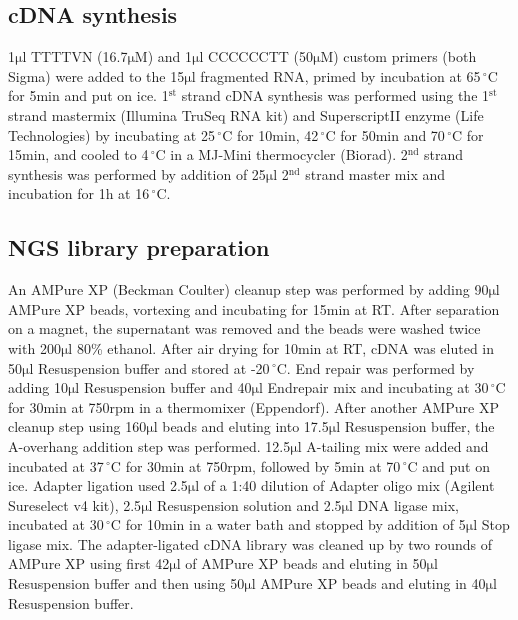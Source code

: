 \documentclass[10pt]{article}
\newcommand{\mul}{\ensuremath{\mathrm{\mu l}}}
\newcommand{\C}{\,$^{\circ}\mathrm{C}$}
\begin{document}
\subsection*{cDNA synthesis}

1{\mul} TTTTVN (16.7$\mathrm{\mu M}$) and 1{\mul} CCCCCCTT (50$\mathrm{\mu M}$) custom primers (both Sigma) were added to the 15{\mul} fragmented RNA, primed by incubation at 65{\C} for 5min and put on ice. 1$^\mathrm{st}$ strand cDNA synthesis was performed using the 1$^\mathrm{st}$ strand mastermix (Illumina TruSeq RNA kit) and SuperscriptII enzyme (Life Technologies) by incubating at 25{\C} for 10min, 42{\C} for 50min and 70{\C} for 15min, and cooled to 4{\C} in a MJ-Mini thermocycler (Biorad). 2$^\mathrm{nd}$ strand synthesis was performed by addition of 25{\mul} 2$^\mathrm{nd}$ strand master mix and incubation for 1h at 16{\C}.

\subsection*{NGS library preparation}

An AMPure XP (Beckman Coulter) cleanup step was performed by adding 90{\mul} AMPure XP beads, vortexing and incubating for 15min at RT. After separation on a magnet, the supernatant was removed and the beads were washed twice with 200{\mul} 80\% ethanol. After air drying for 10min at RT, cDNA was eluted in 50{\mul} Resuspension buffer and stored at -20{\C}.
End repair was performed by adding 10{\mul} Resuspension buffer and 40{\mul} Endrepair mix and incubating at 30{\C} for 30min at 750rpm in a thermomixer (Eppendorf).
After another AMPure XP cleanup step using 160{\mul} beads and eluting into 17.5{\mul} Resuspension buffer, the A-overhang addition step was performed. 12.5{\mul} A-tailing mix were added and incubated at 37{\C} for 30min at 750rpm, followed by 5min at 70{\C} and put on ice. Adapter ligation used 2.5{\mul} of a 1:40 dilution of Adapter oligo mix (Agilent Sureselect v4 kit), 2.5{\mul} Resuspension solution and 2.5{\mul} DNA ligase mix, incubated at 30{\C} for 10min in a water bath and stopped by addition of 5{\mul} Stop ligase mix. The adapter-ligated cDNA library was cleaned up by two rounds of AMPure XP using first 42{\mul} of AMPure XP beads and eluting in 50{\mul} Resuspension buffer and then using 50{\mul} AMPure XP beads and eluting in 40{\mul} Resuspension buffer.
\end{document}
